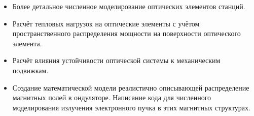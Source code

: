 \begin{itemize}
	\item Более детальное численное моделирование оптических элементов станций.
	\item Расчёт тепловых нагрузок на оптические элементы с учётом пространственного распределения мощности на поверхности оптического элемента.
	\item Расчёт влияния устойчивости оптической системы к механическим подвижкам.
	\item Создание математической модели реалистично описывающей распределение магнитных полей в ондуляторе. Написание кода для численного моделирования излучения электронного пучка в этих магнитных структурах.
\end{itemize}